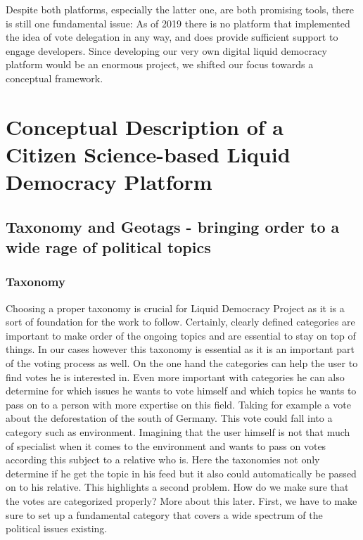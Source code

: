 Despite both platforms, especially the latter one, are both promising tools, there is still one fundamental issue: As of 2019 there is no  platform that implemented the idea of vote delegation in any way, and does provide sufficient support to engage developers. Since developing our very own digital liquid democracy platform would be an enormous project, we shifted our focus towards a conceptual framework.







\section{Conceptual Description of a Citizen Science-based Liquid Democracy Platform}
\label{sec:Conceptual_Approach}




\subsection{Taxonomy and Geotags - bringing order to a wide rage of political topics}
\label{sec:Model_Contexts}
\subsubsection{Taxonomy}
Choosing a proper taxonomy is crucial for Liquid Democracy Project as it is a sort of foundation for the work to follow. Certainly, clearly defined categories are important to make order of the ongoing topics and are essential to stay on top of things. In our cases however this taxonomy is essential as it is an important part of the voting process as well. On the one hand the categories can help the user to find votes he is interested in. Even more important with categories he can also determine for which issues he wants to vote himself and which topics he wants to pass on to a person with more expertise on this field. Taking for example a vote about the deforestation of the south of Germany. This vote could fall into a category such as environment. Imagining that the user himself is not that much of specialist when it comes to the environment and wants to pass on votes according this subject to a relative who is. Here the taxonomies not only determine if he get the topic in his feed but it also could automatically be passed on to his relative. This highlights a second problem. How do we make sure that the votes are categorized properly? More about this later. First, we have to make sure to set up a fundamental category that covers a wide spectrum of the political issues existing.

